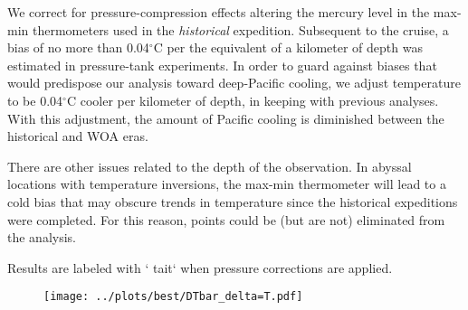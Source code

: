 \documentclass[12pt]{article}
\begin{document}
We correct for pressure-compression effects altering the mercury level
in the max-min thermometers used in the {\it historical} expedition.
Subsequent to the cruise, a bias of no more than 0.04$^\circ$C per the
equivalent of a kilometer of depth was estimated in pressure-tank
experiments\cite{Tait--1882:Pressure}. In order to guard against
biases that would predispose our analysis toward deep-Pacific cooling,
we adjust temperature to be 0.04$^\circ$C cooler per kilometer of
depth, in keeping with previous
analyses\cite{Roemmich-Gould-2012:135}. With this adjustment, the
amount of Pacific cooling is diminished between the historical and WOA
eras.

There are other issues related to the depth of the observation.  In
abyssal locations with temperature inversions, the max-min thermometer
will lead to a cold bias that may obscure trends in temperature since
the historical expeditions were completed. For this reason, points
could be (but are not) eliminated from the analysis.

Results are labeled with ` tait` when pressure corrections are
applied. 

 \begin{figure}%
 \begin{center}
 \texttt{[image: ../plots/best/DTbar\_delta=T.pdf]} \\
 \end{center} 
 \end{figure}

\newpage







\clearpage


\end{document}
